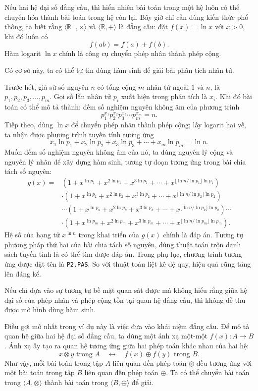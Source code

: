 \documentclass[11pt]{article}
\begin{document}
Nếu hai hệ đại số đẳng cấu, thì hiển nhiên bài toán trong một hệ luôn có thể
chuyển hóa thành bài toán trong hệ còn lại. Bây giờ chỉ cần dùng kiến thức phổ
thông, ta biết rằng \(\langle \mathbb{R}^+,\times\rangle\) và
\(\langle \mathbb{R},+\rangle\) là đẳng cấu: đặt \(f(x)=\ln x\) với \(x>0\),
khi đó luôn có
\[
  f(ab)=f(a)+f(b).
\]
Hàm logarit \(\ln x\) chính là công cụ chuyển phép nhân thành phép cộng.

Có cơ sở này, ta có thể tự tin dùng hàm sinh để giải bài phân tích nhân tử.

Trước hết, giả sử số nguyên \(n\) có tổng cộng \(m\) nhân tử ngoài \(1\) và
\(n\), là \(p_1,p_2,p_3,\ldots,p_m\). Gọi số lần nhân tử \(p_i\) xuất hiện
trong phân tích là \(x_i\). Khi đó bài toán có thể mô tả thành: đếm số nghiệm
nguyên không âm của phương trình
\[
  p_1^{x_1}p_2^{x_2}p_3^{x_3}\cdots p_m^{x_m}=n.
\]
Tiếp theo, dùng \(\ln x\) để chuyển phép nhân thành phép cộng; lấy logarit hai
vế, ta nhận được phương trình tuyến tính tương ứng
\[
  x_1\ln p_1+x_2\ln p_2+x_3\ln p_3+\cdots+x_m\ln p_m=\ln n.
\]
Muốn đếm số nghiệm nguyên không âm của nó, ta dùng nguyên lý cộng và nguyên
lý nhân để xây dựng hàm sinh, tương tự đoạn tương ứng trong bài chia tách số
nguyên:
\[
\begin{aligned}
g(x)=&
(1+x^{\ln p_1}+x^{2\ln p_1}+x^{3\ln p_1}
  +\cdots+x^{\lfloor\ln n/\ln p_1\rfloor\ln p_1})\\
&\cdot
(1+x^{\ln p_2}+x^{2\ln p_2}+x^{3\ln p_2}
  +\cdots+x^{\lfloor\ln n/\ln p_2\rfloor\ln p_2})\\
&\cdots
(1+x^{\ln p_k}+x^{2\ln p_k}+x^{3\ln p_k}
  +\cdots+x^{\lfloor\ln n/\ln p_k\rfloor\ln p_k})
\cdots\\
&\cdot
(1+x^{\ln p_m}+x^{2\ln p_m}+x^{3\ln p_m}
  +\cdots+x^{\lfloor\ln n/\ln p_m\rfloor\ln p_m}).
\end{aligned}
\]
Hệ số của hạng tử \(x^{\ln n}\) trong khai triển của \(g(x)\) chính là đáp
án. Tương tự phương pháp thứ hai của bài chia tách số nguyên, dùng thuật toán
trộn danh sách tuyến tính là có thể tìm được đáp án. Trong phụ lục, chương
trình tương ứng được đặt tên là \texttt{P2.PAS}. So với thuật toán liệt kê đệ
quy, hiệu quả cũng tăng lên đáng kể.

Nếu chỉ dựa vào sự tương tự bề mặt quan sát được mà không hiểu rằng giữa hệ
đại số của phép nhân và phép cộng tồn tại quan hệ đẳng cấu, thì không dễ thu
được mô hình dùng hàm sinh.

Điều gợi mở nhất trong ví dụ này là việc đưa vào khái niệm đẳng cấu. Để mô tả
quan hệ giữa hai hệ đại số đẳng cấu, ta dùng một ánh xạ một-một
\(f(x):A\to B\). Ánh xạ ấy tạo ra quan hệ tương ứng giữa hai phép toán khác
nhau của hai hệ:
\[
  x\otimes y \text{ trong } A
  \quad\longleftrightarrow\quad
  f(x)\oplus f(y) \text{ trong } B.
\]
Như vậy, mỗi bài toán trong tập \(A\) liên quan đến phép toán \(\otimes\) đều
tương ứng với một bài toán trong tập \(B\) liên quan đến phép toán \(\oplus\).
Ta có thể chuyển bài toán trong \(\langle A,\otimes\rangle\) thành bài toán
trong \(\langle B,\oplus\rangle\) để giải.
\end{document}
